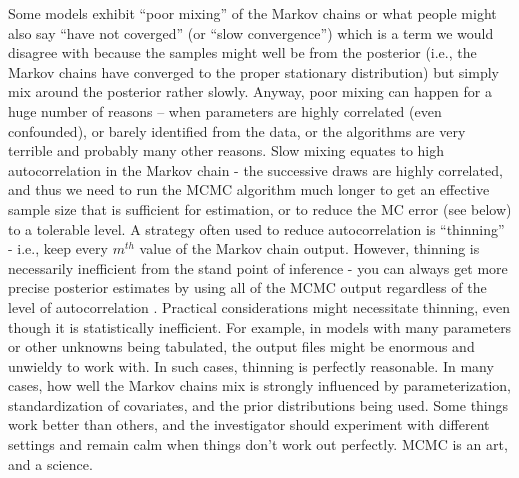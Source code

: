 Some models exhibit ``poor mixing'' of the Markov chains or what
people might also say ``have not coverged'' (or ``slow convergence'')
which is a term we would disagree with because the samples might well
be from the posterior (i.e., the Markov chains have converged to the
proper stationary distribution) but simply mix around the posterior
rather slowly. Anyway, poor mixing can happen for a huge number of
reasons -- when parameters are highly correlated (even confounded), or
barely identified from the data, or the algorithms are very terrible
and probably many other reasons.  Slow mixing equates to high
autocorrelation in the Markov chain - the successive draws are highly
correlated, and thus we need to run the MCMC algorithm much longer to
get an effective sample size that is sufficient for estimation, or to
reduce the MC error (see below) to a tolerable level.  A strategy often used to
reduce autocorrelation is ``thinning'' - i.e., keep every $m^{th}$
value of the Markov chain output. However, thinning is necessarily
inefficient from the stand point of inference - you can always get
more precise posterior estimates by using all of the MCMC output
regardless of the level of autocorrelation
\citep{maceachern_berliner:1994, link_eaton:2011}. Practical considerations might
necessitate thinning, even though it is statistically inefficient. For
example, in models with many parameters or other unknowns being
tabulated, the output files might be enormous and unwieldy to work
with. In such cases, thinning is perfectly reasonable. In many cases,
how well the Markov chains mix is strongly influenced by
parameterization, standardization of covariates, and the prior
distributions being used. Some things work better than others, and the
investigator should experiment with different settings and
remain calm when things don't work out perfectly. MCMC is an
art, and a science.


